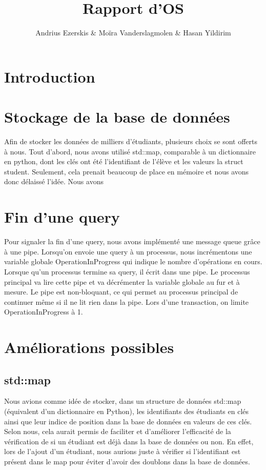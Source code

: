 \documentclass[utf8]{article}
\title{Rapport d'OS}
\author{Andrius Ezerskis \& Moïra Vanderslagmolen \& Hasan Yildirim}
\begin{document}
\section{Introduction}

\section{Stockage de la base de données}

Afin de stocker les données de milliers d'étudiants, plusieurs choix se sont offerts à nous. 
Tout d'abord, nous avons utilisé std::map, comparable à un dictionnaire en python, dont les
clés ont été l'identifiant de l'élève et les valeurs la struct student. Seulement, cela
prenait beaucoup de place en mémoire et nous avons donc délaissé l'idée. Nous avons 

\section{Fin d'une query}

Pour signaler la fin d'une query, nous avons implémenté une message queue grâce à une pipe. Lorsqu'on envoie 
une query à un processus, nous incrémentons une variable globale OperationInProgress qui indique le nombre d'opérations en cours.
Lorsque qu'un processus termine sa query, il écrit dans une pipe. Le processus principal va lire cette pipe et va décrémenter
la variable globale au fur et à mesure. Le pipe est non-bloquant, ce qui permet au processus principal de continuer
même si il ne lit rien dans la pipe. Lors d'une transaction, on limite OperationInProgress à 1.

\section{Améliorations possibles}
    \subsection{std::map}
    Nous avions comme idée de stocker, dans un structure de données std::map (équivalent d'un dictionnaire en Python), les identifiants des étudiants en clés ainsi que leur indice de position dans la base de données en valeurs de ces clés. \newline
    Selon nous, cela aurait permis de faciliter et d'améliorer l'efficacité de la vérification de si un étudiant est déjà dans la base de données ou non. \newline En effet, lors de l'ajout d'un étudiant, nous aurions juste à vérifier si l'identifiant est présent dans le map pour éviter d'avoir des doublons dans la base de données.
\end{document}
